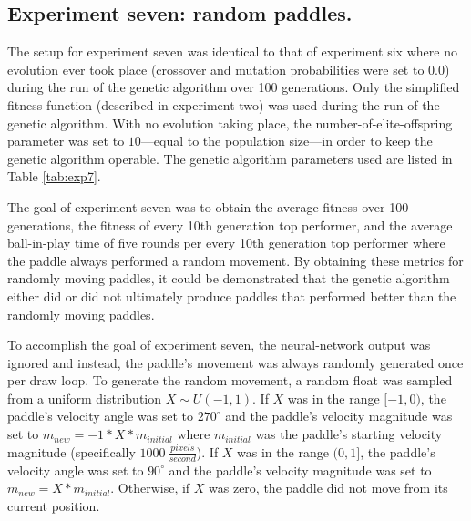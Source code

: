 \documentclass[a4paper,10pt]{article}
\begin{document}
\subsection{Experiment seven: random paddles.} 


The setup for experiment seven was identical to that of experiment six where no evolution ever took place (crossover and mutation probabilities were set to $0.0$) during the run of the genetic algorithm over 100 generations. Only the simplified fitness function (described in experiment two) was used during the run of the genetic algorithm. With no evolution taking place, the number-of-elite-offspring parameter was set to $10$---equal to the population size---in order to keep the genetic algorithm operable. The genetic algorithm parameters used are listed in Table \ref{tab:exp7}. 

The goal of experiment seven was to obtain the average fitness over 100 generations, the fitness of every 10th generation top performer, and the average ball-in-play time of five rounds per every 10th generation top performer where the paddle always performed a random movement. By obtaining these metrics for randomly moving paddles, it could be demonstrated that the genetic algorithm either did or did not ultimately produce paddles that performed better than the randomly moving paddles. 

To accomplish the goal of experiment seven, the neural-network output was ignored and instead, the paddle's movement was always randomly generated once per draw loop. To generate the random movement, a random float was sampled from a uniform distribution $X\sim U(-1,1)$. If $X$ was in the range $[-1,0)$, the paddle's velocity angle was set to $270^\circ$ and the paddle's velocity magnitude was set to $m_{new} = -1 * X * m_{initial}$ where $m_{initial}$ was the paddle's starting velocity magnitude (specifically $1000 \ \frac{pixels}{second}$). If $X$ was in the range $(0,1]$, the paddle's velocity angle was set to $90^\circ$ and the paddle's velocity magnitude was set to $m_{new} = X * m_{initial}$. Otherwise, if $X$ was zero, the paddle did not move from its current position. 
\end{document}
